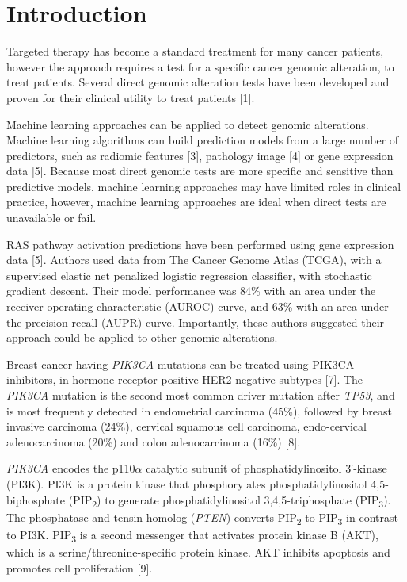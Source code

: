 \documentclass[10pt,letterpaper]{article}
\begin{document}

\linenumbers

\hypertarget{introduction}{%
\section{Introduction}\label{introduction}}

Targeted therapy has become a standard treatment for many cancer
patients, however the approach requires a test for a specific cancer
genomic alteration, to treat patients. Several direct genomic alteration
tests have been developed and proven for their clinical utility to treat
patients {[}1{]}.

Machine learning approaches can be applied to detect genomic
alterations. Machine learning algorithms can build prediction models
from a large number of predictors, such as radiomic features {[}3{]},
pathology image {[}4{]} or gene expression data {[}5{]}. Because most
direct genomic tests are more specific and sensitive than predictive
models, machine learning approaches may have limited roles in clinical
practice, however, machine learning approaches are ideal when direct
tests are unavailable or fail.

RAS pathway activation predictions have been performed using gene
expression data {[}5{]}. Authors used data from The Cancer Genome Atlas
(TCGA), with a supervised elastic net penalized logistic regression
classifier, with stochastic gradient descent. Their model performance
was 84\% with an area under the receiver operating characteristic
(AUROC) curve, and 63\% with an area under the precision-recall (AUPR)
curve. Importantly, these authors suggested their approach could be
applied to other genomic alterations.

Breast cancer having \emph{PIK3CA} mutations can be treated using PIK3CA
inhibitors, in hormone receptor-positive HER2 negative subtypes {[}7{]}.
The \emph{PIK3CA} mutation is the second most common driver mutation
after \emph{TP53}, and is most frequently detected in endometrial
carcinoma (45\%), followed by breast invasive carcinoma (24\%), cervical
squamous cell carcinoma, endo-cervical adenocarcinoma (20\%) and colon
adenocarcinoma (16\%) {[}8{]}.

\emph{PIK3CA} encodes the p110\(\alpha\) catalytic subunit of
phosphatidylinositol 3′-kinase (PI3K). PI3K is a protein kinase that
phosphorylates phosphatidylinositol 4,5-biphosphate
(PIP\textsubscript{2}) to generate phosphatidylinositol
3,4,5-triphosphate (PIP\textsubscript{3}). The phosphatase and tensin
homolog (\emph{PTEN}) converts PIP\textsubscript{2} to
PIP\textsubscript{3} in contrast to PI3K. PIP\textsubscript{3} is a
second messenger that activates protein kinase B (AKT), which is a
serine/threonine-specific protein kinase. AKT inhibits apoptosis and
promotes cell proliferation {[}9{]}.
\end{document}
